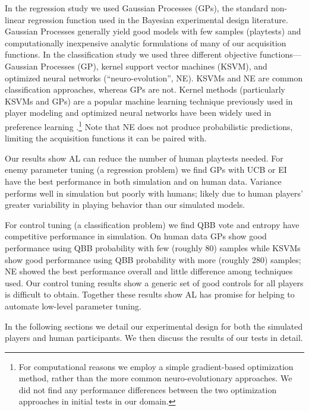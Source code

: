 \documentclass{sig-alternate}
\begin{document}
In the regression study we used Gaussian Processes (GPs), the standard non-linear regression function used in the Bayesian experimental design literature.
Gaussian Processes generally yield good models with few samples (playtests) and computationally inexpensive analytic formulations of many of our acquisition functions.
In the classification study we used three different objective functions---Gaussian Processes (GP), kernel support vector machines (KSVM), and optimized neural networks (``neuro-evolution'', NE).
KSVMs and NE are common classification approaches, whereas GPs are not.
Kernel methods (particularly KSVMs and GPs) are a popular machine learning technique previously used in player modeling \cite{yu2011:minboredom} and optimized neural networks have been widely used in preference learning \cite{yannakakis2011:edpcg}.\footnote{For computational reasons we employ a simple gradient-based optimization method, rather than the more common neuro-evolutionary approaches. 
We did not find any performance differences between the two optimization approaches in initial tests in our domain.}
Note that NE does not produce probabilistic predictions, limiting the acquisition functions it can be paired with.

Our results show AL can reduce the number of human playtests needed.
For enemy parameter tuning (a regression problem) we find GPs with UCB or EI have the best performance in both simulation and on human data.
Variance performs well in simulation but poorly with humans; likely due to human players' greater variability in playing behavior than our simulated models.

For control tuning (a classification problem) we find QBB vote and entropy have competitive performance in simulation.
On human data GPs show good performance using QBB probability with few (roughly 80) samples while KSVMs show good performance using QBB probability with more (roughly 280) samples; NE showed the best performance overall and little difference among techniques used.
Our control tuning results show a generic set of good controls for all players is difficult to obtain.
Together these results show AL has promise for helping to automate low-level parameter tuning.

In the following sections we detail our experimental design for both the simulated players and human participants.
We then discuss the results of our tests in detail.
\end{document}
